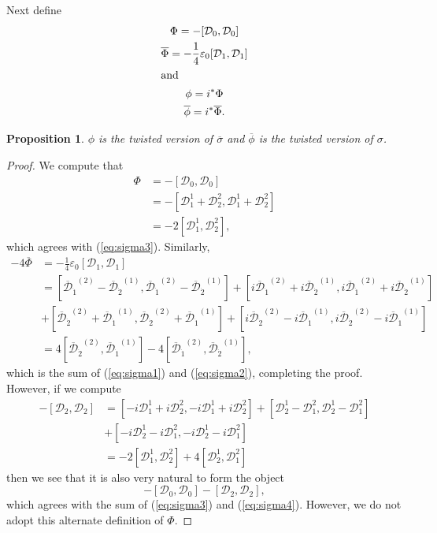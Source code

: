 \documentclass[twoside]{amsart}
\newtheorem{prop}{Proposition}
\renewcommand{\eqref}[1]{(\ref{eq:#1})}
\renewcommand{\epsilon}{\varepsilon}
\newcommand{\enm}[1]{\ensuremath{#1}}
\newcommand{\cdibar}[1]{\enm{\bar{\mathcal{D}}_{\dot{#1}}}}
\renewcommand{\bar}[1]{\overline{#1}}
\newcommand{\onetwoij}[2]{\enm{#1^{(#2)}}}
\newcommand{\one}[1]{\onetwoij{#1}{1}}
\newcommand{\two}[1]{\onetwoij{#1}{2}}
\renewcommand{\epsilon}{\varepsilon}
\newcommand{\doc}{\enm{\mathcal{D}_{1}}}
\newcommand{\dzc}{\enm{\mathcal{D}_{0}}}
\newcommand{\dtc}{\enm{\mathcal{D}_{2}}}
\begin{document}
Next define
\begin{gather*}
    \Phi = -[\dzc,\dzc] \\
    \bar{\Phi} = -\frac{1}{4}\epsilon_0[\doc,\doc] \\
    \intertext{and}
    \phi = i^*\Phi \\
    \bar{\phi} = i^*\bar{\Phi}.
\end{gather*}
\begin{prop}
    \( \phi \) is the twisted version of \( \bar{\sigma} \) and \(
    \bar{\phi} \) is the twisted version of \( \sigma \).
\end{prop}
\begin{proof} We compute that
\begin{align*}
    \Phi &= -[\dzc,\dzc]\\
    &=-[\mathcal{D}^{1}_{1}+\mathcal{D}^{2}_{2},
    \mathcal{D}^{1}_{1}+\mathcal{D}^{2}_{2}] \\
    &= -2[\mathcal{D}^{1}_{1},\mathcal{D}^{2}_{2}],
\end{align*}
which agrees with \eqref{sigma3}.  Similarly,
\begin{align*}
    -4\bar{\Phi} &= -\frac{1}{4}\epsilon_{0}[\doc,\doc]\\
    &=[\two{\cdibar{1}}-\one{\cdibar{2}},\two{\cdibar{1}}-
      \one{\cdibar{2}}]
    +[i\two{\cdibar{1}}+i\one{\cdibar{2}},i\two{\cdibar{1}}+i\one{\cdibar{2}
     }]\\
    &+[\two{\cdibar{2}}+\one{\cdibar{1}},\two{\cdibar{2}}+\one{\cdibar{1}}]
    +[i\two{\cdibar{2}}-i\one{\cdibar{1}},i\two{\cdibar{2}}-i\one{\cdibar{1}}]\\
    &=4[\two{\cdibar{2}},\one{\cdibar{1}}]-4[\two{\cdibar{1}},\one{\cdibar{2}}],
\end{align*}
which is the sum of \eqref{sigma1} and \eqref{sigma2},
completing the proof.  However, if we compute
\begin{align*}
    -[\dtc,\dtc] &= [-i\mathcal{D}_{1}^{1}+i\mathcal{D}_{2}^{2},
                     -i\mathcal{D}_{1}^{1}+i\mathcal{D}_{2}^{2}]
                   +[\mathcal{D}_{2}^{1}-\mathcal{D}_{1}^{2},
                     \mathcal{D}_{2}^{1}-\mathcal{D}_{1}^{2}]\\
                  & +[-i\mathcal{D}_{2}^{1}-i\mathcal{D}_{1}^{2},
                     -i\mathcal{D}_{2}^{1}-i\mathcal{D}_{1}^{2}] \\
                 &= -2[\mathcal{D}^{1}_{1}, \mathcal{D}^{2}_{2}] +
                   4[\mathcal{D}_{2}^{1},\mathcal{D}_{1}^{2}]
\end{align*}
then we see that it is also very natural to form the object
\[ -[\dzc,\dzc]-[\dtc,\dtc], \]
which agrees with the sum of \eqref{sigma3} and \eqref{sigma4}.
However, we do not adopt this alternate definition of \( \Phi \).
\end{proof}
\end{document}

